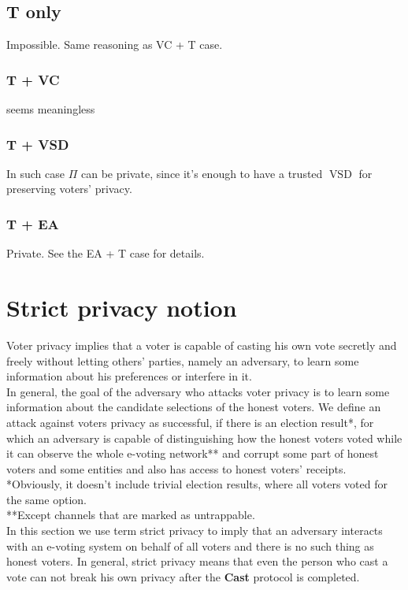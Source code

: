 \documentclass[12pt]{article}
\DeclareMathOperator{\vsd}{VSD}
\begin{document}
\subsection{T only}
  Impossible. Same reasoning as VC + T case.
\subsubsection{T + VC}
   seems meaningless
\subsubsection{T + VSD}
    In such case $\Pi$ can be private, since it's enough to have a trusted $\vsd$ for preserving voters' privacy. 
\subsubsection{T + EA}
   Private. See the EA + T case for details. 
%
\section{Strict privacy notion}
Voter privacy implies that a voter is capable of casting his own vote secretly and freely without letting others' parties, namely an adversary, to learn some information about his preferences or interfere in it.\\

In general, the goal of the adversary who attacks voter privacy is to learn some information about the candidate selections of the honest voters. We define an attack against voters privacy as successful, if there is an election result*, for which an adversary is capable of distinguishing how the honest voters voted while it can observe the whole e-voting network** and corrupt some part of honest voters and some entities and also has access to honest voters' receipts. \\

*Obviously, it doesn't include trivial election results, where all voters voted for the same option. \\
**Except channels that are marked as untrappable. \\



In this section we use term strict privacy to imply that an adversary interacts with an e-voting system on behalf of all voters and there is no such thing as honest voters. In general, strict privacy means that even the person who cast a vote can not break his own privacy after the \textbf{Cast} protocol is completed. \\
\end{document}
